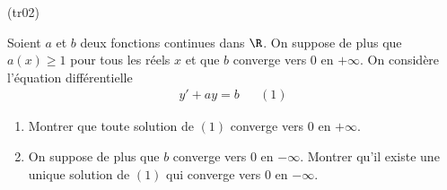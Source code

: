\begin{tiny}(tr02)\end{tiny}
Soient $a$ et $b$ deux fonctions continues dans $\R$. On suppose de plus que $a(x)\geq 1$ pour tous les réels $x$ et que $b$ converge vers $0$ en $+\infty$. On considère l'équation différentielle
\begin{align*}
 y' + ay=b & &(1)
\end{align*}
\begin{enumerate}
 \item Montrer que toute solution de $(1)$ converge vers $0$ en $+\infty$.
\item On suppose de plus que $b$ converge vers $0$ en $-\infty$. Montrer qu'il existe une unique solution de $(1)$ qui converge vers $0$ en $-\infty$.
\end{enumerate}
